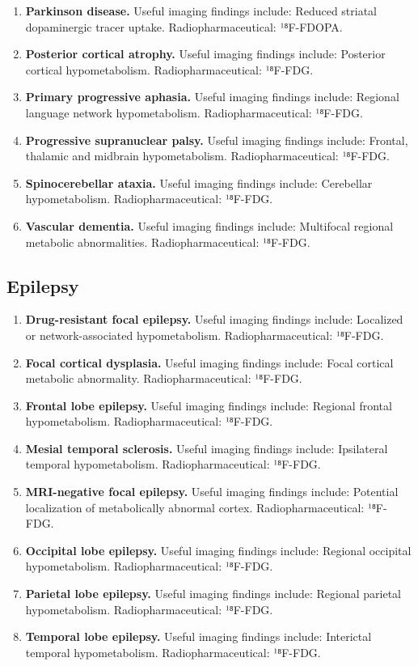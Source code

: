 \begin{enumerate}[leftmargin=*,itemsep=0.45em,topsep=0.4em]
\item \textbf{Parkinson disease.} Useful imaging findings include: Reduced striatal dopaminergic tracer uptake. Radiopharmaceutical: ¹⁸F-FDOPA.
\item \textbf{Posterior cortical atrophy.} Useful imaging findings include: Posterior cortical hypometabolism. Radiopharmaceutical: ¹⁸F-FDG.
\item \textbf{Primary progressive aphasia.} Useful imaging findings include: Regional language network hypometabolism. Radiopharmaceutical: ¹⁸F-FDG.
\item \textbf{Progressive supranuclear palsy.} Useful imaging findings include: Frontal, thalamic and midbrain hypometabolism. Radiopharmaceutical: ¹⁸F-FDG.
\item \textbf{Spinocerebellar ataxia.} Useful imaging findings include: Cerebellar hypometabolism. Radiopharmaceutical: ¹⁸F-FDG.
\item \textbf{Vascular dementia.} Useful imaging findings include: Multifocal regional metabolic abnormalities. Radiopharmaceutical: ¹⁸F-FDG.
\end{enumerate}

\subsection{Epilepsy}
\begin{enumerate}[leftmargin=*,itemsep=0.45em,topsep=0.4em]
\item \textbf{Drug-resistant focal epilepsy.} Useful imaging findings include: Localized or network-associated hypometabolism. Radiopharmaceutical: ¹⁸F-FDG.
\item \textbf{Focal cortical dysplasia.} Useful imaging findings include: Focal cortical metabolic abnormality. Radiopharmaceutical: ¹⁸F-FDG.
\item \textbf{Frontal lobe epilepsy.} Useful imaging findings include: Regional frontal hypometabolism. Radiopharmaceutical: ¹⁸F-FDG.
\item \textbf{Mesial temporal sclerosis.} Useful imaging findings include: Ipsilateral temporal hypometabolism. Radiopharmaceutical: ¹⁸F-FDG.
\item \textbf{MRI-negative focal epilepsy.} Useful imaging findings include: Potential localization of metabolically abnormal cortex. Radiopharmaceutical: ¹⁸F-FDG.
\item \textbf{Occipital lobe epilepsy.} Useful imaging findings include: Regional occipital hypometabolism. Radiopharmaceutical: ¹⁸F-FDG.
\item \textbf{Parietal lobe epilepsy.} Useful imaging findings include: Regional parietal hypometabolism. Radiopharmaceutical: ¹⁸F-FDG.
\item \textbf{Temporal lobe epilepsy.} Useful imaging findings include: Interictal temporal hypometabolism. Radiopharmaceutical: ¹⁸F-FDG.
\end{enumerate}

